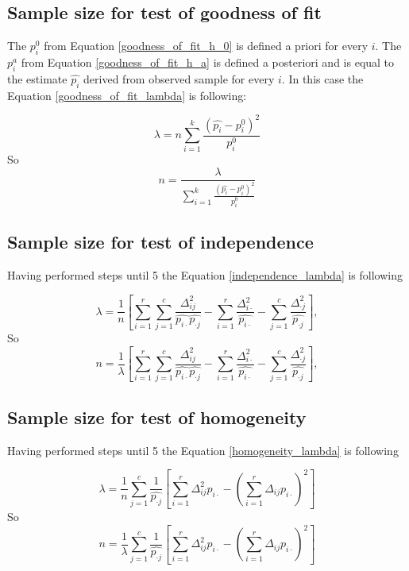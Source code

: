 \documentclass{article}
\begin{document}
\subsection{Sample size for test of goodness of fit}
The $p_i^0$ from Equation \ref{goodness_of_fit_h_0} is defined a priori for every $i$.
The $p_i^a$ from Equation \ref{goodness_of_fit_h_a} is defined a posteriori and is equal to the estimate $\widehat{p_{i}}$ derived from observed sample for every $i$.
In this case the Equation \ref{goodness_of_fit_lambda} is following:

\begin{equation}
    \lambda = n \sum_{i=1}^k \frac{\left(\widehat{p_{i}}-p_{i}^0\right)^2}{p_{i}^0}
\end{equation}
So
\begin{equation}
    n = \frac{\lambda}{\sum_{i=1}^k \frac{\left(\widehat{p_{i}}-p_{i}^0\right)^2}{p_{i}^0}}
\end{equation}


\subsection{Sample size for test of independence}

Having performed steps until 5 the Equation \ref{independence_lambda} is following

\begin{equation}
    \lambda = \frac{1}{n}\left[\sum_{i=1}^{r}\sum_{j=1}^c \frac{\Delta_{ij}^2}{\widehat{p_{i\cdot}}\widehat{p_{\cdot j}}} - \sum_{i=1}^{r}\frac{\Delta_{i \cdot}^2}{\widehat{p_{i \cdot}}} - \sum_{j=1}^{c}\frac{\Delta_{\cdot j}^2}{\widehat{p_{\cdot j}}}\right],
\end{equation}
So
\begin{equation}
    n = \frac{1}{\lambda}\left[\sum_{i=1}^{r}\sum_{j=1}^c \frac{\Delta_{ij}^2}{\widehat{p_{i\cdot}}\widehat{p_{\cdot j}}} - \sum_{i=1}^{r}\frac{\Delta_{i \cdot}^2}{\widehat{p_{i \cdot}}} - \sum_{j=1}^{c}\frac{\Delta_{\cdot j}^2}{\widehat{p_{\cdot j}}}\right],
\end{equation}

\subsection{Sample size for test of homogeneity}

Having performed steps until 5 the Equation \ref{homogeneity_lambda} is following

\begin{equation}
    \lambda = \frac{1}{n}\sum_{j=1}^{c}\frac{1}{\widehat{p_{\cdot j}}}\left[ \sum_{i=1}^{r} \Delta_{ij}^2 p_{i\cdot} -  \left(\sum_{i=1}^{r} \Delta_{ij} p_{i\cdot}\right)^2  \right]
\end{equation}
So
\begin{equation}
    n = \frac{1}{\lambda}\sum_{j=1}^{c}\frac{1}{\widehat{p_{\cdot j}}}\left[ \sum_{i=1}^{r} \Delta_{ij}^2 p_{i\cdot} -  \left(\sum_{i=1}^{r} \Delta_{ij} p_{i\cdot}\right)^2  \right]
\end{equation}
\end{document}

